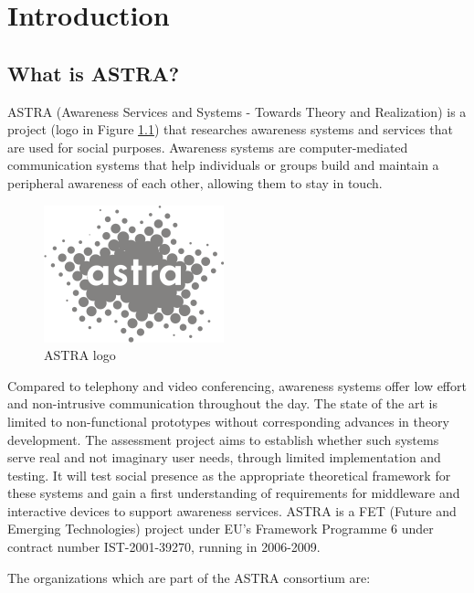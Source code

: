 \chapter{Introduction}

\section{What is ASTRA?}
\label{section:what-is-astra}
ASTRA (Awareness Services and Systems - Towards Theory and Realization)
\cite{astra02} is a project (logo in Figure \ref{img:astra-logo}) that
researches awareness systems and services that are used for social purposes. 
Awareness systems are computer-mediated communication systems that help
individuals or groups build and maintain a peripheral awareness of each other,
allowing them to stay in touch.

\begin{figure}
 \begin{center}
 \includegraphics{img/astra_logo.png}
 \end{center}
 \caption{\label{img:astra-logo}ASTRA logo}
\end{figure}

Compared to telephony and video conferencing, awareness systems offer
low effort and non-intrusive communication throughout the day. The state of the
art is limited to non-functional prototypes without corresponding advances in
theory development. The assessment project aims to establish whether such systems
serve real and not imaginary user needs, through limited implementation and
testing. It will test social presence as the appropriate theoretical framework
for these systems and gain a first understanding of requirements for middleware
and interactive devices to support awareness services. ASTRA is a FET (Future and
Emerging Technologies) project under EU's Framework Programme 6 under contract
number IST-2001-39270, running in 2006-2009.

The organizations which are part of the ASTRA consortium are:

